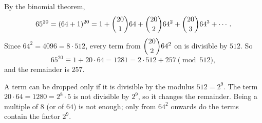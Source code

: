 By the binomial theorem,
\[65^{20}=(64+1)^{20}=1+\dbinom{20}{1}64+\dbinom{20}{2}64^2+\dbinom{20}{3}64^3+\cdots.\]
Since $64^2=4096=8\cdot512$, every term from $\dbinom{20}{2}64^2$ on is divisible by $512$. So
\[65^{20}\equiv1+20\cdot64=1281=2\cdot512+257\pmod{512},\]
and the remainder is $\boxed{257}$.

A term can be dropped only if it is divisible by the modulus $512=2^9$. The term $20\cdot64=1280=2^8\cdot5$ is not divisible by $2^9$, so it changes the remainder. Being a multiple of $8$ (or of $64$) is not enough; only from $64^2$ onwards do the terms contain the factor $2^9$.
